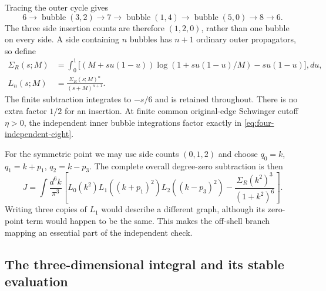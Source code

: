 Tracing the outer cycle gives
\begin{equation}
 6\longrightarrow\operatorname{bubble}(3,2)\longrightarrow7
 \longrightarrow\operatorname{bubble}(1,4)
 \longrightarrow\operatorname{bubble}(5,0)\longrightarrow8
 \longrightarrow6.
\end{equation}
The three side insertion counts are therefore $(1,2,0)$, rather than one
bubble on every side.  A side containing $n$ bubbles has $n+1$ ordinary
outer propagators, so define
\begin{align}
 \Sigma_R(s;M)
 &=\int_0^1\bigl[(M+s u(1-u))
       \log(1+s u(1-u)/M)-s u(1-u)\bigr],du,\\
 L_n(s;M)&=\frac{\Sigma_R(s;M)^n}{(s+M)^{n+1}}.
 \label{eq:four-independent-line}
\end{align}
The finite subtraction integrates to $-s/6$ and is retained throughout.
There is no extra factor $1/2$ for an insertion.  At finite common
original-edge Schwinger cutoff $\eta>0$, the independent inner bubble
integrations factor exactly in \eqref{eq:four-independent-eight}.

For the symmetric point we may use side counts $(0,1,2)$ and choose
$q_0=k$, $q_1=k+p_1$, $q_2=k-p_3$.  The complete overall degree-zero
subtraction is then
\begin{equation}
 J=\int\frac{d^6k}{\pi^3}
 \left[L_0(k^2)L_1((k+p_1)^2)L_2((k-p_3)^2)
       -\frac{\Sigma_R(k^2)^3}{(1+k^2)^6}\right].
 \label{eq:four-independent-outer}
\end{equation}
Writing three copies of $L_1$ would describe a different graph, although its
zero-point term would happen to be the same.  This makes the off-shell
branch mapping an essential part of the independent check.

\subsection{The three-dimensional integral and its stable evaluation}

